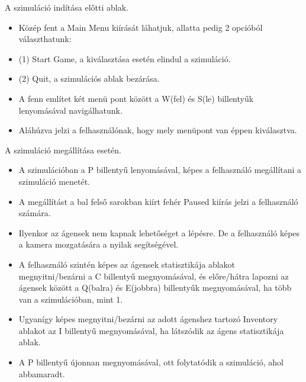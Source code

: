 
A szimuláció indítása előtti ablak.

\begin{itemize}
    \item Közép fent a Main Menu kiírását láhatjuk, allatta pedig 2 opcióból választhatunk:
    \item (1) Start Game, a kiválasztása esetén elindul a szimuláció.
    \item (2) Quit, a szimulációs ablak bezárása.
    \item A fenn említet két menü pont között a W(fel) és S(le) billentyűk lenyomásával navigálhatunk.
    \item Aláhúzva jelzi a felhasználónak, hogy mely menüpont van éppen kiválasztva.
\end{itemize}

A szimuláció megállítása esetén.

\begin{itemize}
    \item A szimulációban a P billentyű lenyomásával, képes a felhasználó megállítani a szimuláció menetét.
    \item A megállítást a bal felső sarokban kiírt fehér Paused kiírás jelzi a felhasználó számára.
    \item Ilyenkor az ágensek nem kapnak lehetőséget a lépésre. De a felhasználó képes a kamera mozgatására a nyilak segítségével.
    \item A felhasználó szintén képes az ágensek statisztikája ablakot megnyitni/bezárni a C billentyű megnyomásával, és előre/hátra lapozni az ágensek között a Q(balra) és E(jobbra) billentyűk megnyomásával, ha több van a szimulációban, mint 1.
    \item Ugyanígy képes megnyitni/bezárni az adott ágenshez tartozó Inventory ablakot az I billentyű megnyomásával, ha látszódik az ágens statisztikája ablak.
    \item A P billentyű újonnan megnyomásával, ott folytatódik a szimuláció, ahol abbamaradt.
\end{itemize}


\label{UI}

